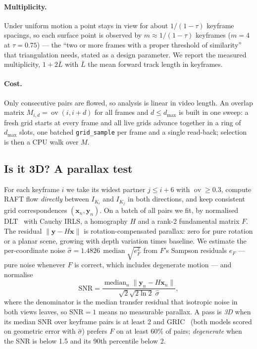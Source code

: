\documentclass[10pt,a4paper,twocolumn]{article}
\newcommand{\ov}{\operatorname{ov}}
\begin{document}
\paragraph{Multiplicity.} Under uniform motion a point stays in view for about $1/(1-\tau)$ keyframe spacings, so each surface point is observed by $m\approx 1/(1-\tau)$ keyframes ($m=4$ at $\tau=0.75$) --- the ``two or more frames with a proper threshold of similarity'' that triangulation needs, stated as a design parameter. We report the measured multiplicity, $1+2\bar L$ with $\bar L$ the mean forward track length in keyframes.

\paragraph{Cost.} Only consecutive pairs are flowed, so analysis is linear in video length. An overlap matrix $M_{i,d}=\ov(i,i{+}d)$ for all frames and $d\le d_{\max}$ is built in one sweep: a fresh grid starts at every frame and all live grids advance together in a ring of $d_{\max}$ slots, one batched \texttt{grid\_sample} per frame and a single read-back; selection is then a CPU walk over $M$.

\subsection{Is it 3D? A parallax test}\label{sec:verdict}
For each keyframe $i$ we take its widest partner $j\le i+6$ with $\ov\ge0.3$, compute RAFT flow \emph{directly} between $I_{K_i}$ and $I_{K_j}$ in both directions, and keep consistent grid correspondences $(\mathbf{x}_n,\mathbf{y}_n)$. On a batch of all pairs we fit, by normalised DLT~\cite{hartley1997eightpoint} with Cauchy IRLS, a homography $H$ and a rank-2 fundamental matrix $F$. The residual $\lVert\mathbf{y}-H\mathbf{x}\rVert$ is rotation-compensated parallax: zero for pure rotation or a planar scene, growing with depth variation times baseline. We estimate the per-coordinate noise $\hat\sigma = 1.4826\,\operatorname{median}\sqrt{e_F^2}$ from $F$'s Sampson residuals $e_F$ --- pure noise whenever $F$ is correct, which includes degenerate motion --- and normalise
\begin{equation}
\mathrm{SNR} = \frac{\operatorname{median}_n\lVert\mathbf{y}_n-H\mathbf{x}_n\rVert}{\sqrt{2}\sqrt{2\ln2}\;\hat\sigma},
\end{equation}
where the denominator is the median transfer residual that isotropic noise in both views leaves, so SNR$=1$ means no measurable parallax. A pass is \emph{3D} when its median SNR over keyframe pairs is at least 2 and GRIC~\cite{torr1998gric} (both models scored on geometric error with $\hat\sigma$) prefers $F$ on at least 60\% of pairs; \emph{degenerate} when the SNR is below 1.5 and its 90th percentile below 2.
\end{document}
